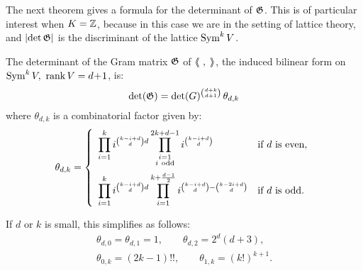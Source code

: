 The next theorem gives a formula for the determinant of $\mathfrak{G}$. This is of particular interest when $K=\mathbb{Z}$, because in this case we are in the setting of lattice theory, and $\left|\det \mathfrak{G}\right|$ is the discriminant of the lattice $\operatorname{Sym}^kV$.
\begin{theorem} \label{maintheorem}
The determinant of the Gram matrix $\mathfrak{G}$ of $\left<\!\!\!\:\left<\ ,\;\right>\!\!\!\:\right>$, the induced bilinear form on $\operatorname{Sym}^kV,\ \operatorname{rank} V = d\!+\!1$, is:
\begin{equation}\label{maintheorem1}
\det(\mathfrak{G})= \det(G)^{\binom{d+k}{d+1}}\,\theta_{d,k}
\end{equation}
where $\theta_{d,k}$ is a combinatorial factor given by:
\begin{equation} \label{thetaDef}
\theta_{d,k} = \left\{
 \begin{array}{*2{l}p{5cm}}
 \displaystyle\prod_{i=1}^k i^{\binom{k-i+d}{d}d}\prod_{\substack{i=1 \\ i\ \text{odd}\\\ }}^{2k+d-1}i^{\binom{k-i+d}{d}} &\text{if }d\text{ is even}, \\
 \displaystyle\prod_{i=1}^k i^{\binom{k-i+d}{d}d}\prod_{i=1}^{k+\frac{d-1}{2}} i^{\binom{k-i+d}{d} - \binom{k-2i+d}{d}} &\text{if }d\text{ is odd}.
\end{array}
\right.
\end{equation}
\end{theorem}
\begin{remark} If $d$ or $k$ is small, this simplifies as follows:
\begin{gather*}
\theta_{d,0}=\theta_{d,1} =1,\qquad \theta_{d,2} = 2^{d}(d+3), \\
\theta_{0,k} = (2k-1)!!, \qquad \theta_{1,k} = (k!)^{k+1}.
\end{gather*}
\end{remark}
